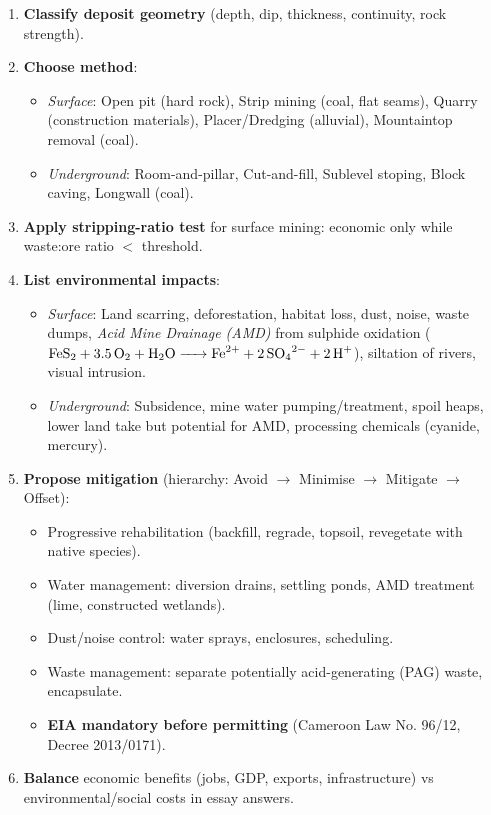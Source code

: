 \documentclass[11pt]{article}
\begin{document}
\begin{methode}
\begin{enumerate}
\item \textbf{Classify deposit geometry} (depth, dip, thickness, continuity, rock strength).
\item \textbf{Choose method}:
\begin{itemize}
\item \emph{Surface}: Open pit (hard rock), Strip mining (coal, flat seams), Quarry (construction materials), Placer/Dredging (alluvial), Mountaintop removal (coal).
\item \emph{Underground}: Room-and-pillar, Cut-and-fill, Sublevel stoping, Block caving, Longwall (coal).
\end{itemize}
\item \textbf{Apply stripping-ratio test} for surface mining: economic only while waste:ore ratio $<$ threshold.
\item \textbf{List environmental impacts}:
\begin{itemize}
\item \emph{Surface}: Land scarring, deforestation, habitat loss, dust, noise, waste dumps, \emph{Acid Mine Drainage (AMD)} from sulphide oxidation ($\ce{FeS2 + 3.5O2 + H2O -> Fe^2+ + 2SO4^2- + 2H+}$), siltation of rivers, visual intrusion.
\item \emph{Underground}: Subsidence, mine water pumping/treatment, spoil heaps, lower land take but potential for AMD, processing chemicals (cyanide, mercury).
\end{itemize}
\item \textbf{Propose mitigation} (hierarchy: Avoid $\rightarrow$ Minimise $\rightarrow$ Mitigate $\rightarrow$ Offset):
\begin{itemize}
\item Progressive rehabilitation (backfill, regrade, topsoil, revegetate with native species).
\item Water management: diversion drains, settling ponds, AMD treatment (lime, constructed wetlands).
\item Dust/noise control: water sprays, enclosures, scheduling.
\item Waste management: separate potentially acid-generating (PAG) waste, encapsulate.
\item \textbf{EIA mandatory before permitting} (Cameroon Law No. 96/12, Decree 2013/0171).
\end{itemize}
\item \textbf{Balance} economic benefits (jobs, GDP, exports, infrastructure) vs environmental/social costs in essay answers.
\end{enumerate}
\end{methode}
\end{document}
